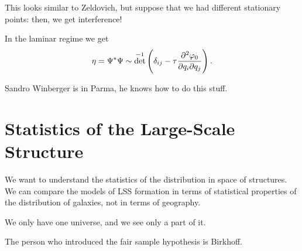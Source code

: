 \documentclass[main.tex]{subfiles}
\begin{document}
This looks similar to Zeldovich, but suppose that we had different stationary points: then, we get interference! 

In the laminar regime we get 
%
\begin{align}
\eta = \Psi^{*} \Psi \sim \det^{-1} \qty(\delta_{ij} - \tau \pdv[2]{\varphi_0 }{q_{i}}{q_{j}})
\,.
\end{align}

Sandro Winberger is in Parma, he knows how to do this stuff. 

\section{Statistics of the Large-Scale Structure}

We want to understand the statistics of the distribution in space of structures.
We can compare the models of LSS formation in terms of statistical properties of the distribution of galaxies, not in terms of geography. 

We only have one universe, and we see only a part of it. 

The person who introduced the fair sample hypothesis is Birkhoff. 
\end{document}
